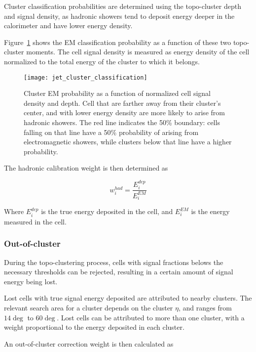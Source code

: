Cluster classification probabilities are determined using the topo-cluster depth and signal density, as hadronic
showers tend to deposit energy deeper in the calorimeter and have lower energy density.\cite{jet-topo-cluster}

Figure~\ref{fig:jet_cluster_classification} shows the EM classification probability as a function of these two
topo-cluster moments.
The cell signal density is measured as energy density of the cell normalized to the total energy
of the cluster to which it belongs.

\begin{figure}[h!]
    \centering
\texttt{[image: jet\_cluster\_classification]}
\caption{Cluster EM probability as a function of normalized cell signal density and depth.
Cell that are farther away from their cluster's center, and with lower energy density are more likely to arise
from hadronic showers.
The red line indicates the 50\% boundary: cells falling on that line have a 50\% probability of arising from
electromagnetic showers, while clusters below that line have a higher probability.}
\label{fig:jet_cluster_classification}
\end{figure}\cite{jet-topo-cluster}

The hadronic calibration weight is then determined as

\begin{equation}\label{eq:had_cal_weight}
    w_{i}^{had} = \frac{E^{dep}_i}{E^{EM}_i}
\end{equation}

Where $E^{dep}_i$ is the true energy deposited in the cell, and $E^{EM}_i$ is the energy measured in the cell.

\subsubsection{Out-of-cluster}\label{subsub:out_of_cluster}
During the topo-clustering process, cells with signal fractions belows the necessary thresholds can be rejected,
resulting in a certain amount of signal energy being lost.

Lost cells with true signal energy deposited are attributed to nearby clusters.
The relevant search area for a cluster depends on the cluster $\eta$, and ranges from $14\deg$ to $60\deg$.\cite{jet-topo-cluster}
Lost cells can be attributed to more than one cluster, with a weight proportional to the energy deposited in each cluster.

An out-of-cluster correction weight is then calculated as

